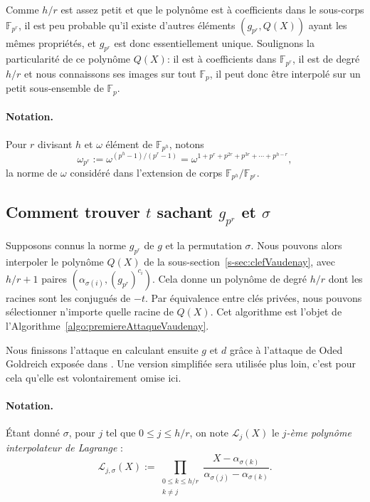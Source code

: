\documentclass[a4paper, titlepage, 11pt]{article}
\theoremstyle{definition}
\theoremstyle{remark}
\def\gf #1{\mathbb{F}_{#1}}
\newcommand{\extension}[2]{{#1} / {#2}} %
\begin{document}
Comme $h/r$ est assez petit et que le polynôme est à coefficients dans le sous-corps $\gf{p^r}$, il est peu probable qu'il existe d'autres éléments $(g_{p^r}, Q(X))$ ayant les mêmes propriétés, et $ g_{p^r}$ est donc essentiellement unique. Soulignons la particularité de ce polynôme $Q(X)$: il est à coefficients dans $\gf{p^r}$, il est de degré $h/r$ et nous connaissons ses images sur tout $\gf{p}$, il peut donc être interpolé sur un petit sous-ensemble de $\gf{p}$.

\paragraph{Notation.} Pour $r$ divisant $h$ et $\omega$ élément de $\gf{p^h}$, notons $$\omega_{p^r} := \omega^{(p^h-1)/(p^r-1)} = \omega^{1+p^r+p^{2r}+p^{3r}+\cdots+p^{h-r}},$$
la norme de $\omega$ considéré dans l'extension de corps $\extension{\gf{p^h}}{\gf{p^r}}$.

\subsection{Comment trouver $t$ sachant $ g_{p^r}$ et $\sigma$}

Supposons connus la norme $g_{p^r}$ de $g$ et la permutation $\sigma$. Nous pouvons alors interpoler le polynôme $Q(X)$ de la sous-section~\ref{s-sec:clefVaudenay}, avec $h/r +1$ paires ${(\alpha_{\sigma(i)}, ( g_{p^r})^{c_i})}$. Cela donne un polynôme de degré $h/r$ dont les racines sont les conjugués de $- t$.  Par équivalence entre clés privées, nous pouvons sélectionner n'importe quelle racine de $Q(X)$. Cet algorithme est l'objet de l'Algorithme~\ref{algo:premiereAttaqueVaudenay}.

Nous finissons l'attaque en calculant ensuite $g$ et $d$ grâce à l'attaque de Oded Goldreich exposée dans \cite[VII.A.3]{chorRivest1988}. Une version simplifiée sera utilisée plus loin, c'est pour cela qu'elle est volontairement omise ici.

\paragraph{Notation.}Étant donné $\sigma$, pour $j$ tel que $0\leqslant j \leqslant h/r$, on note $\mathcal L_j(X)$ le \textit{$j$-ème polynôme interpolateur de Lagrange} :
$$\mathcal L_{j,\sigma}(X) := \prod_{\substack{0\leqslant k\leqslant h/r \\ k \neq j}}\frac{X-\alpha_{\sigma(k)}}{\alpha_{\sigma(j)}-\alpha_{\sigma(k)}}.$$
\end{document}
